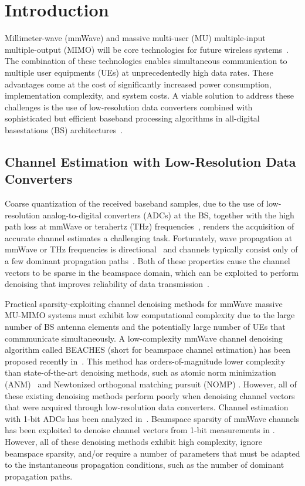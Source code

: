 \section{Introduction}
%
Millimeter-wave (mmWave) and massive multi-user (MU) multiple-input multiple-output (MIMO) will be  core technologies for future wireless systems~\cite{larsson14a, rappaport15a}.
%
The combination of these technologies enables simultaneous communication to multiple user equipments (UEs) at unprecedentedly high data rates. 
%
These advantages come at the cost of significantly increased power consumption, implementation complexity, and system costs. A viable solution to address these challenges is the use of low-resolution data converters combined with sophisticated but efficient baseband processing algorithms in all-digital basestations (BS) architectures~\cite{dutta2019case,jacobsson17b,li17b,mo16b,panagiotis20}. 

\subsection{Channel Estimation with Low-Resolution Data Converters}
%
Coarse quantization of the received baseband samples, due to the use of low-resolution analog-to-digital converters (ADCs) at the BS, together with the high path loss at mmWave or terahertz (THz) frequencies~\cite{rappaport15b, gao16}, renders the acquisition of accurate channel estimates a challenging task.
%
Fortunately,  wave propagation at mmWave or THz frequencies is directional~\cite{akdeniz14a} and channels typically consist only of a few dominant propagation paths~\cite{rappaport13a,rappaport15a}. Both of these properties cause the channel vectors to be sparse in the beamspace domain, which can be exploited to perform denoising that improves reliability of data transmission~\cite{alkhateeb14a,mo14b,tang13,brady13,ghods19a}. 

Practical sparsity-exploiting channel denoising methods for mmWave massive MU-MIMO systems must exhibit low computational complexity due to the large number of BS antenna elements and the potentially large number of UEs that commmunicate simultaneously.
%
A low-complexity mmWave channel denoising algorithm called BEACHES (short for beamspace channel estimation) has been proposed recently in~\cite{ghods19a}. This method has orders-of-magnitude lower complexity than state-of-the-art denoising methods, such as atomic norm minimization (ANM)~\cite{bhaskar13} and Newtonized orthogonal matching pursuit (NOMP) \cite{mamandipoor16}. 
%
However, all of these existing denoising methods perform poorly when denoising channel vectors that were acquired through low-resolution data converters. 
%
Channel estimation with 1-bit ADCs has been analyzed in~\cite{li17b,li16a,jacobsson17b,mollen16c,studer16a}. 
%
Beamspace sparsity of mmWave channels has been exploited to denoise channel vectors from 1-bit measurements in \cite{mo16b, huang19,kaushik18}.
%
However, all of these denoising methods exhibit high complexity, ignore beamspace sparsity, and/or require a number of parameters that must be adapted to the instantaneous propagation conditions, such as the number of dominant propagation paths.  


